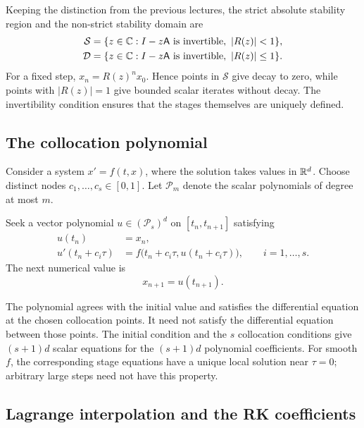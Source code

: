 Keeping the distinction from the previous lectures, the strict
absolute stability region and the non-strict stability domain are
\begin{align*}
 \mathcal S&=\{z\in\bb C: I-z\mathsf A\text{ is invertible},\ |R(z)|<1\},\\
 \mathcal D&=\{z\in\bb C: I-z\mathsf A\text{ is invertible},\ |R(z)|\leq1\}.
\end{align*}
For a fixed step, \(x_n=R(z)^n x_0\). Hence points in \(\mathcal S\)
give decay to zero, while points with \(|R(z)|=1\) give bounded
scalar iterates without decay. The invertibility condition ensures
that the stages themselves are uniquely defined.

\subsection{The collocation polynomial}

Consider a system \(x'=f(t,x)\), where the solution takes values in
\(\mathbb{R}^d\). Choose distinct nodes \(c_1,\ldots,c_s\in[0,1]\).
Let \(\mathcal P_m\) denote the
scalar polynomials of degree at most \(m\).

\begin{definition}
 Seek a vector polynomial \(u\in(\mathcal P_s)^d\) on
 \([t_n,t_{n+1}]\) satisfying
 \begin{align}
  u(t_n)&=x_n,\label{eq:collocation-initial-sep-21}\\
  u'(t_n+c_i\tau)
   &=f\bigl(t_n+c_i\tau,u(t_n+c_i\tau)\bigr),
   \qquad i=1,\ldots,s.
   \label{eq:collocation-equations-sep-21}
 \end{align}
 The next numerical value is
 \[
  x_{n+1}=u(t_{n+1}).
 \]
\end{definition}

The polynomial agrees with the initial value and satisfies the
differential equation at the chosen collocation points. It need not
satisfy the differential equation between those points. The initial
condition and the \(s\) collocation conditions give \((s+1)d\)
scalar equations for the \((s+1)d\) polynomial coefficients.
For smooth \(f\), the corresponding stage equations have a unique
local solution near \(\tau=0\); arbitrary large steps need not have
this property.

\subsection{Lagrange interpolation and the RK coefficients}

